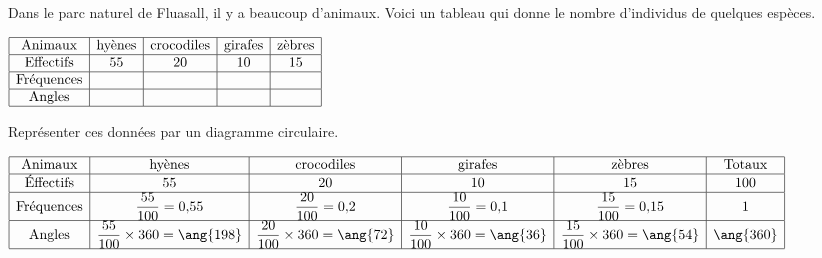 \begin{corrige}
    Dans le parc naturel de Fluasall, il y a beaucoup d'animaux.
    Voici un tableau qui donne le nombre d'individus de quelques espèces.

    \medskip
    $
    \begin{array}{|c|c|c|c|c|}
    \hline
    \text{Animaux} & \text{hyènes} & \text{crocodiles} & \text{girafes} & \text{zèbres}\\
    \hline
    \text{Effectifs} & 55 & 20 & 10 & 15\\
    \hline
    \text{Fréquences} &   &   &   &  \\
    \hline
    \text{Angles} &   &   &   &  \\
    \hline
    \end{array}
    $


    \medskip
    Représenter ces données par un diagramme circulaire.

    \smallskip
    {\red
    	$\renewcommand{\arraystretch}{1}
        \begin{array}{|c|c|c|c|c|c|}
        \hline
        \text{Animaux} & \text{hyènes} & \text{crocodiles} & \text{girafes} & \text{zèbres} & \text{Totaux}\\
        \hline
        \text{Éffectifs} & 55 & 20 & 10 & 15 & 100\\
        \hline
        \text{Fréquences} & \dfrac{55}{100}=0{,}55 & \dfrac{20}{100}=0{,}2 & \dfrac{10}{100}=0{,}1 & \dfrac{15}{100}=0{,}15 & 1\\
        \hline
        \text{Angles} & \dfrac{55}{100} \times 360 = \ang{198} & \dfrac{20}{100} \times 360 = \ang{72} & \dfrac{10}{100} \times 360 = \ang{36} & \dfrac{15}{100} \times 360 = \ang{54} & \ang{360}\\
        \hline
        \end{array}
        \renewcommand{\arraystretch}{1}$
        
        \bigskip
        \begin{tikzpicture}[baseline,scale=0.6]


\end{tikzpicture}}
\end{corrige}
